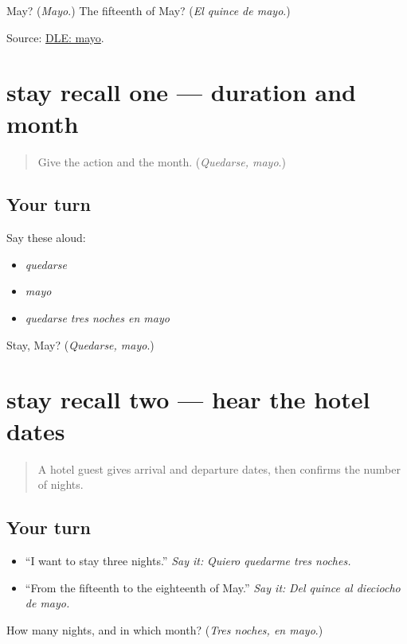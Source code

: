 \begin{tcolorbox}[breakable,colback=teal!4,colframe=teal!35!black,title={Before you move on}]
May? (\emph{Mayo}.) The fifteenth of May? (\emph{El quince de mayo}.)

Source: \href{https://dle.rae.es/mayo}{DLE: mayo}.
\end{tcolorbox}
\section[(review)]{stay recall one — duration and month}

\label{lesson:ES-C416-stay-recall-1}



\begin{quote}
Give the action and the month. (\emph{Quedarse, mayo}.)
\end{quote}

\subsection*{Your turn}
Say these aloud:

\begin{itemize}
\raggedright
  \item \emph{quedarse}
  \item \emph{mayo}
  \item \emph{quedarse tres noches en mayo}
\end{itemize}

\begin{tcolorbox}[breakable,colback=teal!4,colframe=teal!35!black,title={Before you move on}]
Stay, May? (\emph{Quedarse, mayo}.)
\end{tcolorbox}
\section[(review)]{stay recall two — hear the hotel dates}

\label{lesson:ES-C416-stay-recall-2}



\begin{quote}
A hotel guest gives arrival and departure dates, then confirms the number of nights.
\end{quote}

\subsection*{Your turn}
\begin{itemize}
\raggedright
  \item “I want to stay three nights.” \emph{Say it:} \emph{Quiero quedarme tres noches.}
  \item “From the fifteenth to the eighteenth of May.” \emph{Say it:} \emph{Del quince al dieciocho de mayo.}
\end{itemize}

\begin{tcolorbox}[breakable,colback=teal!4,colframe=teal!35!black,title={Before you move on}]
How many nights, and in which month? (\emph{Tres noches, en mayo}.)
\end{tcolorbox}
